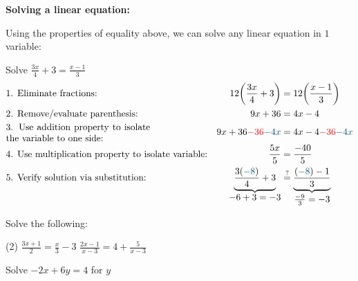 \documentclass[../mathNotesPreamble]{subfiles}
\begin{document}
  \noindent\textbf{Solving a linear equation:}
  \begin{thmBox*}
    Using the properties of equality above, we can solve any linear equation in $1$ variable:
    \begin{ex*}
      Solve $\displaystyle\frac{3x}{4}+3=\frac{x-1}{3}$
      \begin{align*}
        &\textnormal{1. Eliminate fractions:}& 12\parens{\frac{3x}{4}+3}&=12\parens{\frac{x-1}{3}}\\
        &\textnormal{2. Remove/evaluate parenthesis:}& 9x+36&=4x-4\\
        &\textnormal{\parbox{0.45\linewidth}{3. Use addition property to isolate the variable to one side:}}& 9x+36\textcolor{red}{-36}\textcolor{lander_blue}{-4x}&=4x-4\textcolor{red}{-36}\textcolor{lander_blue}{-4x}\\
        &\textnormal{4. Use multiplication property to isolate variable:}& \frac{5x}{5}&=\frac{-40}{5}\\
        &\textnormal{5. Verify solution via substitution:}& \underbrace{\frac{3(\textcolor{lander_blue}{-8})}{4}+3}_{\textstyle -6+3=-3}&\overset{?}{=}\underbrace{\frac{(\textcolor{lander_blue}{-8})-1}{3}}_{\textstyle \frac{-9}{3}=-3}\\
      \end{align*}
    \end{ex*}
  \end{thmBox*}

  \begin{ex*}
    Solve the following:
    \begin{extasks}[after-item-skip=\stretch{1}](2)
      \task $\displaystyle\frac{3x+1}{2}=\frac{x}{3}-3$
      \task $\displaystyle\frac{2x-1}{x-3}=4+\frac{5}{x-3}$
    \end{extasks}
  \end{ex*}
  \pagebreak

  \begin{ex*}
    Solve $-2x+6y=4$ for $y$
    \begin{flushright}
      \vspace*{-1\baselineskip}
    \end{flushright}
  \end{ex*}
\end{document}
